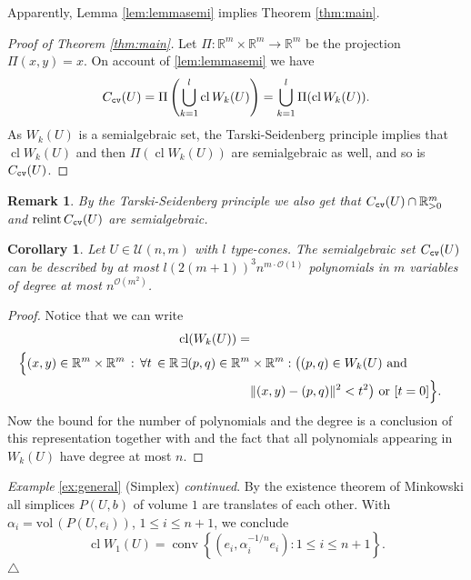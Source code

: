 \documentclass[11pt, a4paper, twoside, reqno]{amsart}
\DeclareMathOperator*{\conv}{conv}
\DeclareMathOperator*{\cl}{cl}
\newcommand{\R}{\mathbb{R}}
\newtheorem{corollary}[theorem]{Corollary}
\newtheorem{remark}[theorem]{Remark}
\theoremstyle{definition}
\theoremstyle{remark}
\newcommand{\vol}{\mathrm{vol}\,}
\newcommand{\cv}{{\tt cv}}
\DeclareMathOperator{\relint}{relint}
\numberwithin{equation}{section}
\begin{document}
Apparently, Lemma \ref{lem:lemmasemi} %
implies Theorem \ref{thm:main}.

\begin{proof}[Proof of Theorem \ref{thm:main}] Let $\Pi:\R^m\times\R^m\to\R^m$ be the projection $\Pi(x,y)=x$. On account of \ref{lem:lemmasemi}  we have
  \begin{equation}
    C_\cv(U)=\Pi\left(\bigcup_{k=1}^l \cl W_k(U)\right) = \bigcup_{k=1}^l\Pi( \cl W_k(U)).
  \label{eq:coneprojection}
  \end{equation}
As $W_k(U)$ is a semialgebraic set, the Tarski-Seidenberg principle implies that $\cl W_k(U)$ and then $\Pi(\cl  W_k(U))$ are  semialgebraic as well, and so is $C_\cv(U)$.
\end{proof}

\begin{remark} By the Tarski-Seidenberg principle \cite[Theorem 2.2.1.]{bochnak2013real} we also get that $C_\cv(U)\cap\R^m_{>0}$ and $\relint C_\cv(U)$ are semialgebraic.
\end{remark}

\begin{corollary} Let $U\in\mathcal{U}(n,m)$ with $l$ type-cones. The semialgebraic set
  $C_\cv(U)$ can be described by at most $l (2(m+1))^3 n^{m \cdot \mathcal{O}(1)}$ polynomials in $m$ variables of
  degree at most $n^{\mathcal{O}(m^2)}$.  
\label{cor:degree}  
\end{corollary}%
\begin{proof} Notice that we can write
\begin{align}
    \cl(W_k(U))  = \\ \Bigl\{  (x,y) \in \R^m \times \R^m \, : \, \forall t \, \in \R \, \exists (p,q) \in \R^m & \times \R^m 
    :  \big((p,q) \in W_k(U)  \text{ and } \\  & \| (x,y) - (p,q) \|^2  < t^2 \big) \text{ or } [t = 0] \Bigl\}.
\end{align}
Now the bound for the number of polynomials and the degree is a conclusion of this representation together with \cite[Theorem 1]{basu1997improved} and the fact that all polynomials appearing in $W_k(U)$ have degree at most $n$.
\end{proof}



\medskip\noindent
{\it Example} \ref{ex:general} (Simplex) {\it continued}. By the existence theorem of Minkowski all simplices $P(U,b)$
  of volume $1$ are translates of each other. With $\alpha_i=\vol(P(U,e_i))$, $1\leq i\leq n+1$, we conclude
  \begin{equation*}
          \cl W_1(U) = \conv\left\{(e_i, \alpha_i^{-1/n}e_i): 1\leq i\leq n+1\right\}.
  \end{equation*}
\hfill $\triangle$
\end{document}
